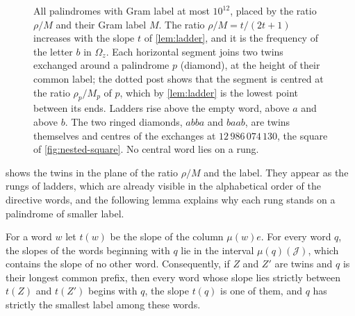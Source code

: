 \begin{figure}[htbp]
\centering

\caption{All palindromes with Gram label at most $10^{12}$, placed by the ratio $\rho/M$ and
their Gram label $M$. The ratio $\rho/M=t/(2t+1)$ increases with the slope $t$ of \cref{lem:ladder}, and it is
the frequency of the letter $b$ in $\Omega_z$. Each horizontal segment joins two twins exchanged
around a palindrome $p$ (diamond), at the height of their common label; the dotted post shows
that the segment is centred at the ratio $\rho_p/M_p$ of $p$, which by \cref{lem:ladder} is the
lowest point between its ends. Ladders rise above the empty word, above $a$ and above $b$. The
two ringed diamonds, $abba$ and $baab$, are twins themselves and centres of the exchanges at
$12\,986\,074\,130$, the square of \cref{fig:nested-square}. No central word lies on a rung.}
\label{fig:ladders}
\end{figure}

 shows the twins in the plane of the ratio $\rho/M$ and the label. They appear
as the rungs of ladders, which are already visible in the alphabetical order of the directive
words, and the following lemma explains why each rung stands on a palindrome of smaller
label.

\begin{lemma}[Ladders]
\label{lem:ladder}
For a word $w$ let $t(w)$ be the slope of the column $\mu(w)e$. For every word $q$, the slopes
of the words beginning with $q$ lie in the interval $\mu(q)(\mathcal J)$, which contains the
slope of no other word. Consequently, if $Z$ and $Z'$ are twins and $q$ is their longest
common prefix, then every word whose slope lies strictly between $t(Z)$ and $t(Z')$ begins
with $q$, the slope $t(q)$ is one of them, and $q$ has strictly the smallest label among
these words.
\end{lemma}

